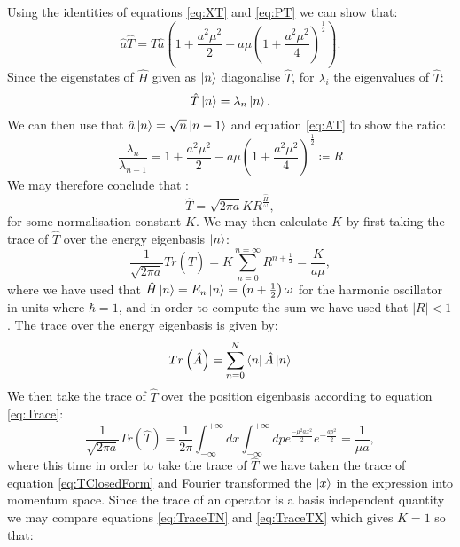 \documentclass[12pt]{article}
\begin{document}
Using the identities of equations \ref{eq:XT} and \ref{eq:PT} we can show that:
\begin{equation}
	\label{eq:AT}
	\hat{a}\hat{T} = \hat{T}\hat{a}\left( 1 + \frac{a^2\mu^2}{2} - a\mu\left( 1 + \frac{a^2\mu^2}{4}\right)^\frac{1}{2} \right).
\end{equation}
Since the eigenstates of $\hat{H}$ given as $\ket{n}$ diagonalise $\hat{T}$, for $\lambda_i$ the eigenvalues of $\hat{T}$:
\begin{equation}
	\label{eq:TEigenstates}
	\hat{T}\ket{n} = \lambda_n \ket{n}.
\end{equation}
We can then use that $\hat{a}\ket{n} = \sqrt{n}\ket{n-1}$ and equation \ref{eq:AT} to show the ratio:
\begin{equation}
	\label{eq:EigenRatio}
	\frac{\lambda_n}{\lambda_{n-1}} = 1 + \frac{a^2\mu^2}{2} - a\mu\left( 1 + \frac{a^2\mu^2}{4}\right)^{\frac{1}{2}} \coloneqq R
\end{equation}
We may therefore conclude that :
\begin{equation}
	\label{eq:TWithK}
	\hat{T} = \sqrt{2\pi a}KR^{\frac{\hat{H}}{\omega}},
\end{equation}
for some normalisation constant $K$. We may then calculate $K$ by first taking the trace of $\hat{T}$ over the energy eigenbasis $\ket{n}$:
\begin{equation}
	\label{eq:TraceTN}
	\frac{1}{\sqrt{2\pi a}} Tr{\left(\hat{T}\right)} = K \sum_{n=0}^{n=\infty} R^{n+\frac{1}{2}} = \frac{K}{a\mu},
\end{equation}
where we have used that $\hat{H}\ket{n} = E_n\ket{n} = \left(n+\frac{1}{2}\right)\omega$ for the harmonic oscillator in units where $\hbar=1$, and in order to compute the sum we have used that $|R| < 1$. The trace over the energy eigenbasis is given by:
\begin{equation}
	\label{eq:EnergyTrace}
	Tr\left(\hat{A}\right) = \sum_{n=0}^{N}\bra{n}\hat{A}\ket{n}
\end{equation}
We then take the trace of $\hat{T}$ over the position eigenbasis according to equation \ref{eq:Trace}:
\begin{equation}
	\label{eq:TraceTX}
	\frac{1}{\sqrt{2\pi a}} Tr{\left(\hat{T}\right)} = \frac{1}{2\pi}\int_{-\infty}^{+\infty}dx\int_{-\infty}^{+\infty}dp e^{\frac{-\mu^2ax^2}{2}}e^{-\frac{ap^2}{2}} = \frac{1}{\mu a},
\end{equation}
where this time in order to take the trace of $\hat{T}$ we have taken the trace of equation \ref{eq:TClosedForm} and Fourier transformed the $\ket{x}$ in the expression into momentum space. Since the trace of an operator is a basis independent quantity we may compare equations \ref{eq:TraceTN} and \ref{eq:TraceTX} which gives $K=1$ so that:
\end{document}
